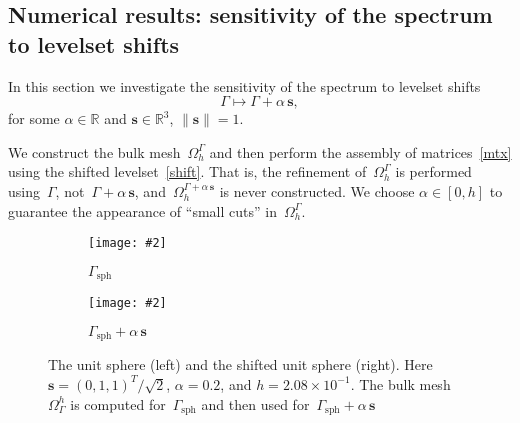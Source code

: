 \documentclass[12pt]{article}
\newcommand{\includegraphicsw}[2][1.]{\texttt{[image: \#2]}}
\newcommand{\vect}[1]{\boldsymbol{\mathbf{#1}}}
\newcommand{\sphere}{{\Gamma_{\text{sph}}}}
\begin{document}
\subsection{Numerical results: sensitivity of the spectrum to levelset shifts}

In this section we investigate the sensitivity of the spectrum to levelset shifts
\begin{equation}\label{shift}
	\Gamma \mapsto \Gamma + \alpha\,\vect s,
\end{equation}
for some $\alpha \in \mathbb R$ and $\vect s \in \mathbb R^3$, $\|\vect s\| = 1$. 

We construct the bulk mesh~$\Omega_h^\Gamma$ and then perform the assembly of matrices~\eqref{mtx} using the shifted levelset~\eqref{shift}. That is, the refinement of~$\Omega_h^\Gamma$ is performed using~$\Gamma$, not~$\Gamma + \alpha\,\vect s$, and~$\Omega_h^{\Gamma + \alpha\,\vect s}$ is never constructed. We choose $\alpha \in [0, h]$ to guarantee the appearance of ``small cuts'' in~$\Omega_h^\Gamma$.

\begin{figure}[h]
	\centering
	\begin{subfigure}{.5\linewidth}
		\centering
		\includegraphicsw{{shift_0.0}.png}
		\caption{$\sphere$}
	\end{subfigure}%
	\begin{subfigure}{.5\linewidth}
		\centering
		\includegraphicsw{{shift_0.2}.png}
		\caption{$\sphere + \alpha\,\vect s$}
	\end{subfigure}%
	\caption{The unit sphere (left) and the shifted unit sphere (right). Here $\vect s = (0, 1, 1)^T/\sqrt{2}$, $\alpha = 0.2$, and $h = 2.08\times10^{-1}$. The bulk mesh~$\Omega_\Gamma^h$ is computed for~$\sphere$ and then used for~$\sphere + \alpha\,\vect s$}
	\label{fig:shift}		
\end{figure}
\end{document}
